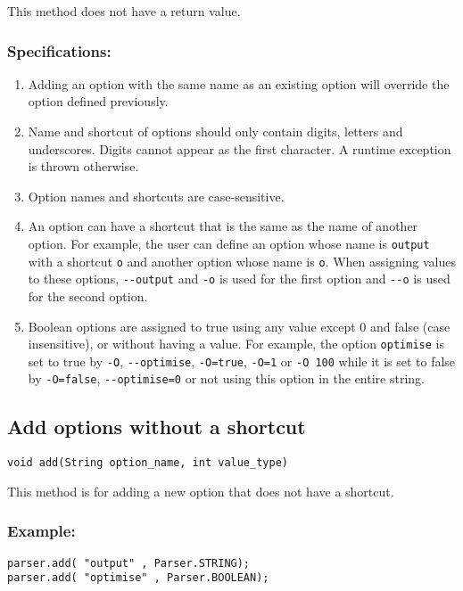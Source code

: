 \documentclass{article}
\begin{document}
This method does not have a return value.

\subsubsection*{Specifications:}
\begin{enumerate}
\item Adding an option with the same name as an existing option will override the option
defined previously.
\item Name and shortcut of options should only contain digits, letters and underscores.
Digits cannot appear as the first character. A runtime exception is thrown otherwise.
\item Option names and shortcuts are case-sensitive.
\item An option can have a shortcut that is the same as the name of another option. For
example, the user can define an option whose name is \lstinline{output} with a shortcut \lstinline{o} and
another option whose name is \lstinline{o}. When assigning values to these options, \lstinline{--output}
and \lstinline{-o} is used for the first option and \lstinline{--o} is used for the second option.
\item Boolean options are assigned to true using any value except 0 and false (case
insensitive), or without having a value. For example, the option \lstinline{optimise} is set to true
by \lstinline{-O}, \lstinline{--optimise}, \lstinline{-O=true}, \lstinline{-O=1} or \lstinline{-O 100} while it is set to false by \lstinline{-O=false},
\lstinline{--optimise=0} or not using this option in the entire string.
\end{enumerate}

\subsection{Add options without a shortcut}
\begin{lstlisting}
void add(String option_name, int value_type)
\end{lstlisting}

This method is for adding a new option that does not have a shortcut.

\subsubsection*{Example:}
\begin{lstlisting}
parser.add( "output" , Parser.STRING);
parser.add( "optimise" , Parser.BOOLEAN);
\end{lstlisting}
\end{document}
